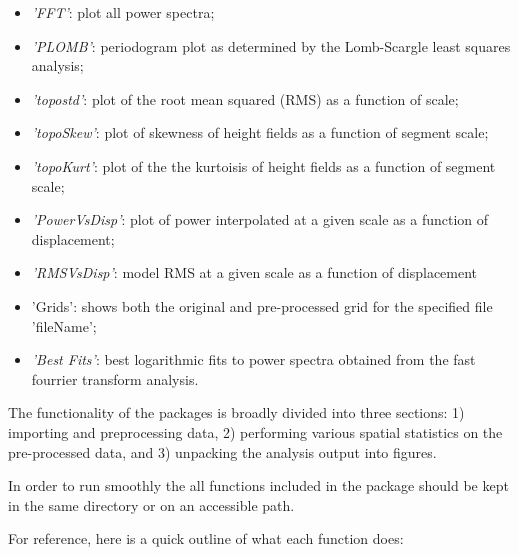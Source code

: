 \documentclass[12pt,a4paper]{article}
\begin{document}
\begin{itemize}
\begin{itemize}
\item[] \textit{'FFT'}: plot all power spectra;
\item[] \textit{'PLOMB'}: periodogram plot as determined by the Lomb-Scargle least squares analysis;
\item[] \textit{'topostd'}: plot of the root mean squared (RMS) as a function of scale;
\item[] \textit{'topoSkew'}: plot of skewness of height fields as a function of segment scale;
\item[] \textit{'topoKurt'}: plot of the the kurtoisis of height fields as a function of segment scale;
\item[] \textit{'PowerVsDisp'}: plot of power interpolated at a given scale as a function of displacement;
\item[] \textit{'RMSVsDisp'}: model RMS at a given scale as a function of displacement
\item[] 'Grids': shows both the original and pre-processed grid for the specified file 'fileName';
\item[] \textit{'Best Fits'}: best logarithmic fits to power spectra obtained from the fast fourrier transform analysis.
\end{itemize}

The functionality of the packages is broadly divided into three sections: 1) importing and preprocessing data, 2) performing various spatial statistics on the pre-processed data, and 3) unpacking the analysis output into figures.

In order to run smoothly the all functions included in the package should be kept in the same directory or on an accessible path. 

For reference, here is a quick outline of what each function does:


\end{itemize}
\end{document}
